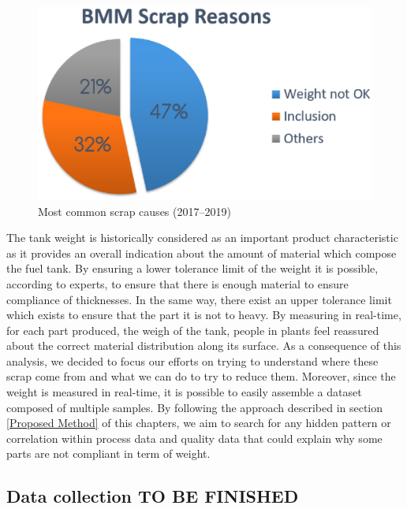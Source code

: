 \begin{figure}
\centerline{\includegraphics[scale=0.9]{images/chapter_3/Scraps_codes.eps}}
\caption{Most common scrap causes (2017--2019)}
\label{fig:Most common scrap causes (2017-2018-2019)}
\end{figure}

The tank weight is historically considered as an important product characteristic as it provides an overall indication about the amount of material which compose the fuel tank. By ensuring a lower tolerance limit of the weight it is possible, according to experts, to ensure that there is enough material to ensure compliance of thicknesses. In the same way, there exist an upper tolerance limit which exists to ensure that the part it is not to heavy. By measuring in real-time, for each part produced, the weigh of the tank, people in plants feel reassured about the correct material distribution along its surface.  
As a consequence of this analysis, we decided to focus our efforts on trying to understand where these scrap come from and what we can do to try to reduce them. Moreover, since the weight is measured in real-time, it is possible to easily assemble a dataset composed of multiple samples. By following the approach described in section \ref{Proposed Method} of this chapters, we aim to search for any hidden pattern or correlation within process data and quality data that could explain why some parts are not compliant in term of weight.


\subsection{Data collection TO BE FINISHED}

